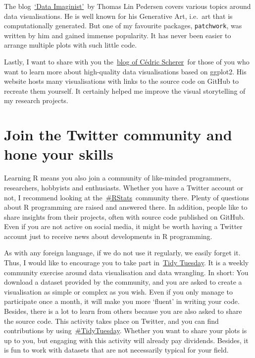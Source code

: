 \documentclass[
]{book}
\begin{document}
The blog~\href{https://www.data-imaginist.com}{`Data Imaginist'}~by Thomas Lin Pedersen covers various topics around data visualisations. He is well known for his Generative Art, i.e.~art that is computationally generated. But one of my favourite packages, \texttt{patchwork}, was written by him and gained immense popularity. It has never been easier to arrange multiple plots with such little code.

Lastly, I want to share with you the~\href{https://www.cedricscherer.com/top/dataviz/}{blog of Cédric Scherer}~for those of you who want to learn more about high-quality data visualisations based on ggplot2. His website hosts many visualisations with links to the source code on GitHub to recreate them yourself. It certainly helped me improve the visual storytelling of my research projects.

\hypertarget{join-the-twitter-community-and-hone-your-skills}{%
\section{Join the Twitter community and hone your skills}\label{join-the-twitter-community-and-hone-your-skills}}

Learning R means you also join a community of like-minded programmers, researchers, hobbyists and enthusiasts. Whether you have a Twitter account or not, I recommend looking at the~\href{https://twitter.com/search?q=\%23rstats}{\#RStats}~community there. Plenty of questions about R programming are raised and answered there. In addition, people like to share insights from their projects, often with source code published on GitHub. Even if you are not active on social media, it might be worth having a Twitter account just to receive news about developments in R programming.

As with any foreign language, if we do not use it regularly, we easily forget it. Thus, I would like to encourage you to take part in~\href{https://www.tidytuesday.com}{Tidy Tuesday}. It is a weekly community exercise around data visualisation and data wrangling. In short: You download a dataset provided by the community, and you are asked to create a visualisation as simple or complex as you wish. Even if you only manage to participate once a month, it will make you more `fluent' in writing your code. Besides, there is a lot to learn from others because you are also asked to share the source code. This activity takes place on Twitter, and you can find contributions by using~\href{https://twitter.com/search?q=\%23tidytuesday}{\#TidyTuesday}. Whether you want to share your plots is up to you, but engaging with this activity will already pay dividends. Besides, it is fun to work with datasets that are not necessarily typical for your field.
\end{document}
